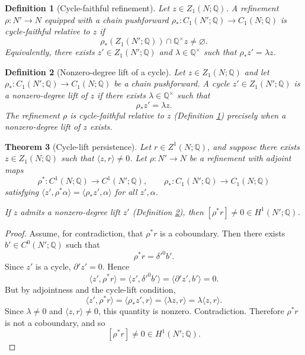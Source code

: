 \documentclass[11pt]{article}
\newtheorem{theorem}{Theorem}[section]
\newtheorem{definition}[theorem]{Definition}
\newcommand{\Q}{\mathbb{Q}}
\begin{document}
\begin{definition}[Cycle-faithful refinement]\label{def:cycle-faithful}
Let \(z\in Z_1(N;\Q)\). A refinement \(\rho:N'\to N\) equipped with a chain
pushforward \(\rho_*:C_1(N';\Q)\to C_1(N;\Q)\) is \emph{cycle-faithful relative
to \(z\)} if
\[
\rho_*(Z_1(N';\Q))\cap \Q^\times z\neq \varnothing.
\]
Equivalently, there exists \(z'\in Z_1(N';\Q)\) and \(\lambda\in\Q^\times\) such
that \(\rho_*z'=\lambda z\).
\end{definition}

\begin{definition}[Nonzero-degree lift of a cycle]\label{def:nz-lift}
Let \(z\in Z_1(N;\Q)\) and let \(\rho_*:C_1(N';\Q)\to C_1(N;\Q)\) be a chain
pushforward. A cycle \(z'\in Z_1(N';\Q)\) is a \emph{nonzero-degree lift of
\(z\)} if there exists \(\lambda\in\Q^\times\) such that
\[
\rho_*z'=\lambda z.
\]
The refinement \(\rho\) is cycle-faithful relative to \(z\) (Definition
\ref{def:cycle-faithful}) precisely when a nonzero-degree lift of \(z\) exists.
\end{definition}

\begin{theorem}[Cycle-lift persistence]\label{thm:cycle-lift}
Let \(r\in Z^1(N;\Q)\), and suppose there exists \(z\in Z_1(N;\Q)\) such that
\(\langle z,r\rangle\neq 0\). Let \(\rho:N'\to N\) be a refinement with adjoint
maps
\[
\rho^*:C^1(N;\Q)\to C^1(N';\Q),
\qquad
\rho_*:C_1(N';\Q)\to C_1(N;\Q)
\]
satisfying \(\langle z',\rho^*\alpha\rangle=\langle\rho_*z',\alpha\rangle\) for
all \(z',\alpha\).

If \(z\) admits a nonzero-degree lift \(z'\) (Definition \ref{def:nz-lift}),
then \([\rho^*r]\neq 0\in H^1(N';\Q)\).
\end{theorem}

\begin{proof}
Assume, for contradiction, that \(\rho^*r\) is a coboundary. Then there exists
\(b'\in C^0(N';\Q)\) such that
\[
\rho^*r=\delta'^0 b'.
\]
Since \(z'\) is a cycle, \(\partial' z'=0\). Hence
\[
\langle z',\rho^*r\rangle
=
\langle z',\delta'^0 b'\rangle
=
\langle \partial' z',b'\rangle
=
0.
\]
But by adjointness and the cycle-lift condition,
\[
\langle z',\rho^*r\rangle
=
\langle \rho_*z',r\rangle
=
\langle \lambda z,r\rangle
=
\lambda\langle z,r\rangle.
\]
Since \(\lambda\neq 0\) and \(\langle z,r\rangle\neq 0\), this quantity is nonzero.
Contradiction. Therefore \(\rho^*r\) is not a coboundary, and so
\[
[\rho^*r]\neq 0\in H^1(N';\Q).
\]
\end{proof}
\end{document}

